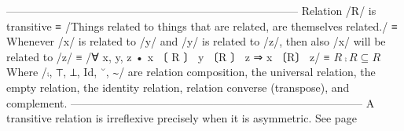 \documentclass[11pt]{article}
\begin{document}
--------------------------------------------------------------------------------   \quad  Relation /R/ is transitive ≡ \quad /Things related to things that are related, are themselves related./ ≡ \quad Whenever /x/ is related to /y/ and /y/ is related to /z/, then also /x/ will  \quad  be related to /z/ ≡ \quad /∀ x, y, z • \quad x 〔 R 〕 y 〔R 〕 z \quad ⇒ \quad x 〔R〕 z/ ≡ \quad $R ⨾ R ⊆ R$  Where /⨾, ⊤, ⊥, Id, ˘, ∼/ are relation composition, the universal relation, the empty relation, the identity relation, relation converse (transpose), and complement.  --------------------------------------------------------------------------------  A transitive relation is irreflexive precisely when it is asymmetric. See page \pageref{org-special-block-extras-glossary-declaration-site-Transitive}
\end{document}
